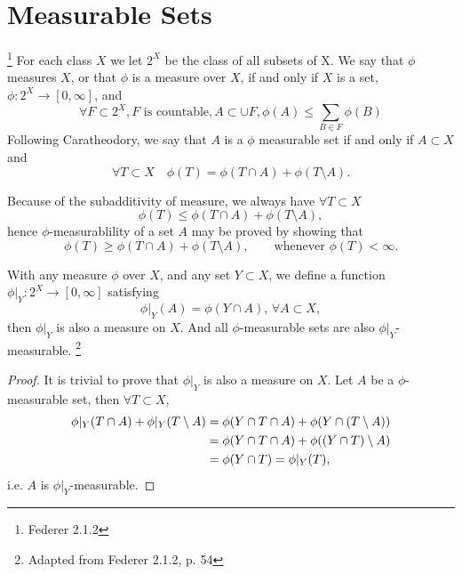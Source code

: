 \section{Measurable Sets}

\begin{definition}
\footnote{Federer 2.1.2}
For each class $X$ we let $2^X$ be the class of all subsets of X.
We say that $\phi$ measures $X$, or that $\phi$ is a measure over $X$, if
and only if $X$ is a set, $\phi:2^X\to [0,\infty]$, and 
\[
  \forall F\subset 2^X, \text{$F$ is countable}, A\subset \cup F,
  \phi(A)\le\sum_{B\in F} \phi(B)
\]
Following Caratheodory, we say that $A$ is a $\phi$ measurable set if and only
if $A\subset X$ and 
\[
  \forall T\subset X \quad \phi(T)=\phi(T\cap A)+\phi(T\setminus A).
\]
\end{definition}

\begin{remark} \label{R:meas}
Because of the subadditivity of measure, we always have $\forall T\subset X$
\[
  \phi(T)\le \phi(T\cap A)+\phi(T\setminus A),
\]
hence $\phi$-measurablility of a set $A$ may be proved by showing that
\[
  \phi(T)\ge \phi(T\cap A)+\phi(T\setminus A), 
    \qquad\text{whenever $\phi(T)<\infty$}.
\]
\end{remark}

\begin{lemma} \label{L:meas_proj}
With any measure $\phi$ over $X$, and any set $Y\subset X$, we define a function
$\phi|_Y:2^X\to [0,\infty]$ satisfying
\[
  \phi|_Y(A) = \phi(Y\cap A),\, \forall A\subset X,
\]
then $\phi|_Y$ is also a measure on $X$. And all $\phi$-measurable sets are also
$\phi|_Y$-measurable.
\footnote{Adapted from Federer 2.1.2, p. 54}
\end{lemma}

\begin{proof}
  It is trivial to prove that $\phi|_Y$ is also a measure on $X$. Let $A$ be a
  $\phi$-measurable set, then $\forall T\subset X$,
  \begin{align*}
    \phi|_Y(T\cap A) + \phi|_Y(T\setminus A)
    &= \phi(Y\cap T\cap A) + \phi(Y\cap(T\setminus A))  \notag \\
    &= \phi(Y\cap T\cap A) + \phi((Y\cap T)\setminus A)  \notag \\
    &= \phi(Y\cap T) = \phi|_Y(T),  \notag \\
  \end{align*}
  i.e. $A$ is $\phi|_Y$-measurable.
\end{proof}

